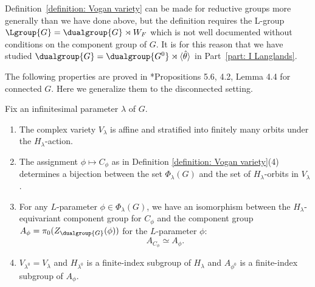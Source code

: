 \documentclass[11pt,letterpaper]{amsart}
\numberwithin{equation}{section}
\begin{document}
\begin{remark}\label{remark: Vogan varieties for general G}
Definition~\ref{definition: Vogan variety} can be made for reductive groups more generally than we have done above, but the definition requires the L-group $\Lgroup{G} = \dualgroup{G}\rtimes W_F$ which is not well documented without conditions on the component group of $G$. It is for this reason that we have studied $\dualgroup{G} = \dualgroup{G^0}\rtimes \langle {\hat\theta} \rangle$ in Part~\ref{part: I Langlands}.
\end{remark}


The following properties are proved in \cite{CFMMX22}*{Propositions 5.6, 4.2, Lemma 4.4} for connected $G$. 
Here we generalize them to the disconnected setting.

\begin{lemma}\label{lemma: bijection parameters and orbits disconnected}
    Fix an infinitesimal parameter $\lambda$ of $G$.
     \begin{enumerate}
   \item 
   The complex variety $V_\lambda$ is affine and stratified into finitely many orbits under the $H_\lambda$-action. 
   \item The assignment $\phi \mapsto C_\phi$ as in Definition \ref{definition: Vogan variety}(4) determines a bijection between the set 
        $\Phi_{\lambda}(G)$ and the set of $H_{\lambda}$-orbits in $V_{\lambda}$. 
    \item  For any $L$-parameter $\phi \in \Phi_{\lambda}(G)$, we have an isomorphism between the $H_{\lambda}$-equivariant component group for $C_{\phi}$ and the component group $A_{\phi}=\pi_0(Z_{\dualgroup{G}}(\phi))$ for the $L$-parameter $\phi$:
    $$A_{C_{\phi}}\simeq A_{\phi}.$$ 
\item $V_{\lambda^0} = V_{\lambda}$ and $H_{\lambda^0}$ is a finite-index subgroup of $H_{\lambda}$ and $A_{\phi^0}$ is a finite-index subgroup of $A_{\phi}$.
    \end{enumerate}
\end{lemma}
\end{document}
